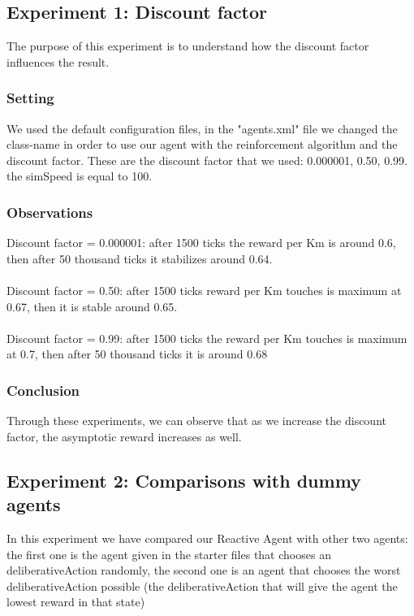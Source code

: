 \documentclass[11pt]{article}
\begin{document}
\subsection{Experiment 1: Discount factor}
The purpose of this experiment is to understand how the discount factor influences the result.

\subsubsection{Setting}
We used the default configuration files, in the "agents.xml" file we changed the class-name in order to use our agent with the reinforcement algorithm and the discount factor. These are the discount factor that we used: { 0.000001, 0.50, 0.99}. the simSpeed is equal to 100.

\subsubsection{Observations}

Discount factor = 0.000001: after 1500 ticks the reward per Km is around 0.6, then after 50 thousand ticks it stabilizes around 0.64.
\\
\\
Discount factor = 0.50: after 1500 ticks reward per Km touches is maximum at 0.67, then it is stable around 0.65.
\\
\\
Discount factor = 0.99: after 1500 ticks the reward per Km touches is maximum at 0.7, then after 50 thousand ticks it is around 0.68

\subsubsection{Conclusion}
Through these experiments, we can observe that as we increase the discount factor, the asymptotic reward increases as well.
\subsection{Experiment 2: Comparisons with dummy agents}
In this experiment we have compared our Reactive Agent with other two agents: the first one is the agent given in the starter files that chooses an deliberativeAction randomly, the second one is an agent that chooses the worst deliberativeAction possible (the deliberativeAction that will give the agent the lowest reward in that state)
\end{document}
